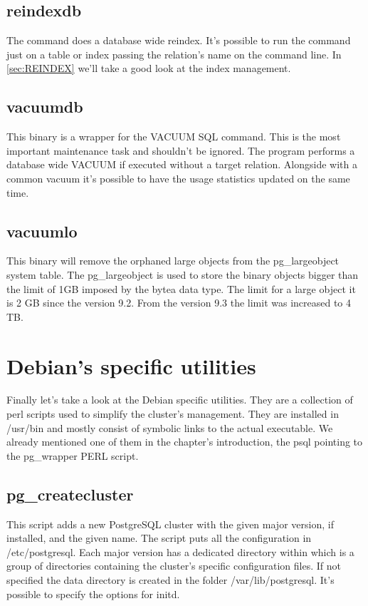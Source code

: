 \subsection{reindexdb}

The command does a database wide reindex. It's possible to run the command just
on a table or index passing the relation's name on the command line. In
\ref{sec:REINDEX} we'll take a good look at the index management.

\subsection{vacuumdb}

This binary is a wrapper for the VACUUM  SQL command. This is the
most important maintenance task and shouldn't be ignored. The program performs
a database wide VACUUM if executed without a target relation. Alongside with a
common vacuum it's possible to have the usage statistics updated on the same
time.

\subsection{vacuumlo}

This binary will remove the orphaned large objects from the pg\_largeobject
system table. The pg\_largeobject is used to store the binary objects bigger
than the limit of 1GB imposed by the bytea data type. The limit for a large
object it is 2 GB since the version 9.2. From the version 9.3 the limit was
increased to 4 TB.

\section{Debian's specific utilities}

Finally let's take a look at the Debian specific utilities. They are a
collection of perl scripts used to simplify the cluster's management. They are
installed in /usr/bin and mostly consist of symbolic links to the actual
executable. We already mentioned one of them in the chapter's introduction, the
psql pointing to the pg\_wrapper PERL script.

\subsection{pg\_createcluster}

This script adds a new PostgreSQL cluster with the given major version, if
installed, and the given name. The script puts all the configuration in
/etc/postgresql. Each major version has a dedicated directory within which is a
group of directories containing the cluster's specific configuration files. If
not specified the data directory is created in the folder /var/lib/postgresql.
It's possible to specify the options for initd.

